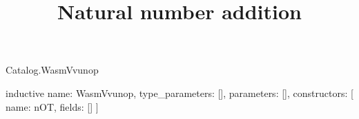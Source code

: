 \begin{lexlean}{Catalog.WasmVvunop}
\title{Natural number addition}
\begin{semanticmodule}
inductive{
  name: WasmVvunop,
  type_parameters: [],
  parameters: [],
  constructors: [
    {name: nOT, fields: []}
  ]
}
\end{semanticmodule}
\end{lexlean}
